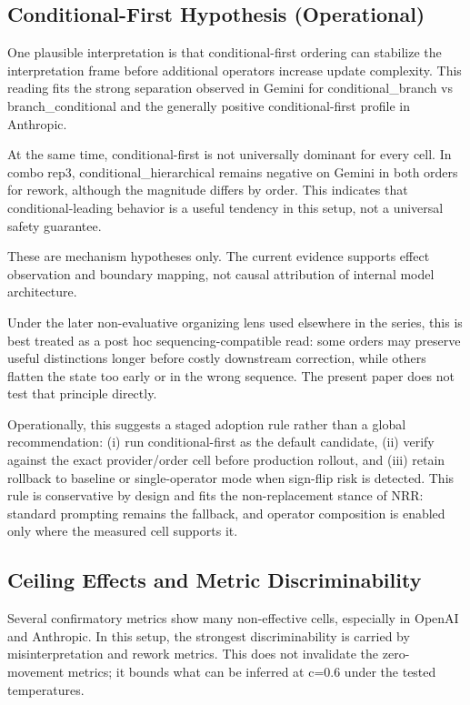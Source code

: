 \documentclass[11pt,a4paper]{article}
\begin{document}
\subsection{Conditional-First Hypothesis (Operational)}

One plausible interpretation is that conditional-first ordering can stabilize the interpretation frame before additional operators increase update complexity. This reading fits the strong separation observed in Gemini for conditional\_branch vs branch\_conditional and the generally positive conditional-first profile in Anthropic.

At the same time, conditional-first is not universally dominant for every cell. In combo rep3, conditional\_hierarchical remains negative on Gemini in both orders for rework, although the magnitude differs by order. This indicates that conditional-leading behavior is a useful tendency in this setup, not a universal safety guarantee.

These are mechanism hypotheses only. The current evidence supports effect observation and boundary mapping, not causal attribution of internal model architecture.

Under the later non-evaluative organizing lens used elsewhere in the series, this is
best treated as a post hoc sequencing-compatible read: some orders may preserve useful
distinctions longer before costly downstream correction, while others flatten the state
too early or in the wrong sequence. The present paper does not test that principle
directly.

Operationally, this suggests a staged adoption rule rather than a global recommendation: (i) run conditional-first as the default candidate, (ii) verify against the exact provider/order cell before production rollout, and (iii) retain rollback to baseline or single-operator mode when sign-flip risk is detected. This rule is conservative by design and fits the non-replacement stance of NRR: standard prompting remains the fallback, and operator composition is enabled only where the measured cell supports it.

\subsection{Ceiling Effects and Metric Discriminability}

Several confirmatory metrics show many non-effective cells, especially in OpenAI and Anthropic. In this setup, the strongest discriminability is carried by misinterpretation and rework metrics. This does not invalidate the zero-movement metrics; it bounds what can be inferred at c=0.6 under the tested temperatures.
\end{document}
